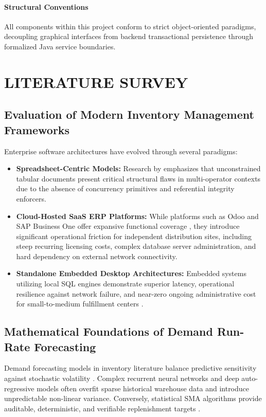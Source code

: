 \documentclass[BTech]{srmuthesis}
\begin{document}
\subsubsection{Structural Conventions}
All components within this project conform to strict object-oriented paradigms, decoupling graphical interfaces from backend transactional persistence through formalized Java service boundaries.

\chapter{LITERATURE SURVEY}
\label{chap:lit}

\section{Evaluation of Modern Inventory Management Frameworks}
Enterprise software architectures have evolved through several paradigms:
\begin{itemize}
    \item \textbf{Spreadsheet-Centric Models:} Research by \citet{toomey2000} emphasizes that unconstrained tabular documents present critical structural flaws in multi-operator contexts due to the absence of concurrency primitives and referential integrity enforcers.
    \item \textbf{Cloud-Hosted SaaS ERP Platforms:} While platforms such as Odoo and SAP Business One offer expansive functional coverage \citep{muller2019}, they introduce significant operational friction for independent distribution sites, including steep recurring licensing costs, complex database server administration, and hard dependency on external network connectivity.
    \item \textbf{Standalone Embedded Desktop Architectures:} Embedded systems utilizing local SQL engines demonstrate superior latency, operational resilience against network failure, and near-zero ongoing administrative cost for small-to-medium fulfillment centers \citep{date2003}.
\end{itemize}

\section{Mathematical Foundations of Demand Run-Rate Forecasting}
Demand forecasting models in inventory literature balance predictive sensitivity against stochastic volatility \citep{silver1998}. Complex recurrent neural networks and deep auto-regressive models often overfit sparse historical warehouse data and introduce unpredictable non-linear variance. Conversely, statistical \ac{SMA} algorithms provide auditable, deterministic, and verifiable replenishment targets \citep{chopra2016}.
\end{document}
